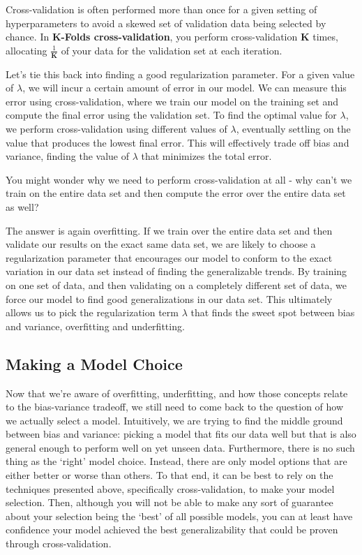 Cross-validation is often performed more than once for a given setting of hyperparameters to avoid a skewed set of validation data being selected by chance. In \textbf{K-Folds cross-validation}, you perform cross-validation \textbf{K} times, allocating $\frac{1}{\textbf{K}}$ of your data for the validation set at each iteration.

Let's tie this back into finding a good regularization parameter. For a given value of $\lambda$, we will incur a certain amount of error in our model. We can measure this error using cross-validation, where we train our model on the training set and compute the final error using the validation set. To find the optimal value for $\lambda$, we perform cross-validation using different values of $\lambda$, eventually settling on the value that produces the lowest final error. This will effectively trade off bias and variance, finding the value of $\lambda$ that minimizes the total error.

You might wonder why we need to perform cross-validation at all - why can't we train on the entire data set and then compute the error over the entire data set as well?

The answer is again overfitting. If we train over the entire data set and then validate our results on the exact same data set, we are likely to choose a regularization parameter that encourages our model to conform to the exact variation in our data set instead of finding the generalizable trends. By training on one set of data, and then validating on a completely different set of data, we force our model to find good generalizations in our data set. This ultimately allows us to pick the regularization term $\lambda$ that finds the sweet spot between bias and variance, overfitting and underfitting.

\subsection{Making a Model Choice}
Now that we're aware of overfitting, underfitting, and how those concepts relate to the bias-variance tradeoff, we still need to come back to the question of how we actually select a model. Intuitively, we are trying to find the middle ground between bias and variance: picking a model that fits our data well but that is also general enough to perform well on yet unseen data. Furthermore, there is no such thing as the `right' model choice. Instead, there are only model options that are either better or worse than others. To that end, it can be best to rely on the techniques presented above, specifically cross-validation, to make your model selection. Then, although you will not be able to make any sort of guarantee about your selection being the `best' of all possible models, you can at least have confidence your model achieved the best generalizability that could be proven through cross-validation.

